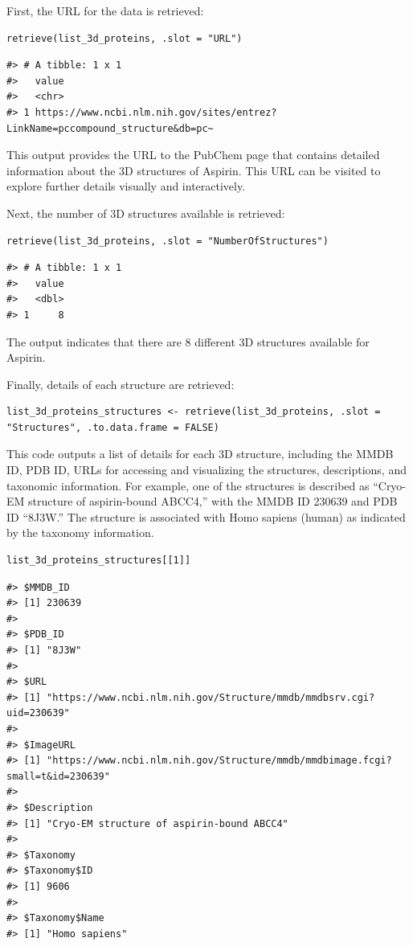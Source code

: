 First, the URL for the data is retrieved:

\begin{verbatim}
retrieve(list_3d_proteins, .slot = "URL")
\end{verbatim}

\begin{verbatim}
#> # A tibble: 1 x 1
#>   value                                                                         
#>   <chr>                                                                         
#> 1 https://www.ncbi.nlm.nih.gov/sites/entrez?LinkName=pccompound_structure&db=pc~
\end{verbatim}

This output provides the URL to the PubChem page that contains detailed information about the 3D structures of Aspirin. This URL can be visited to explore further details visually and interactively.

Next, the number of 3D structures available is retrieved:

\begin{verbatim}
retrieve(list_3d_proteins, .slot = "NumberOfStructures")
\end{verbatim}

\begin{verbatim}
#> # A tibble: 1 x 1
#>   value
#>   <dbl>
#> 1     8
\end{verbatim}

The output indicates that there are 8 different 3D structures available for Aspirin.

Finally, details of each structure are retrieved:

\begin{verbatim}
list_3d_proteins_structures <- retrieve(list_3d_proteins, .slot = "Structures", .to.data.frame = FALSE)
\end{verbatim}

This code outputs a list of details for each 3D structure, including the MMDB ID, PDB ID, URLs for accessing and visualizing the structures, descriptions, and taxonomic information. For example, one of the structures is described as ``Cryo-EM structure of aspirin-bound ABCC4,'' with the MMDB ID 230639 and PDB ID ``8J3W.'' The structure is associated with Homo sapiens (human) as indicated by the taxonomy information.

\begin{verbatim}
list_3d_proteins_structures[[1]]
\end{verbatim}

\begin{verbatim}
#> $MMDB_ID
#> [1] 230639
#> 
#> $PDB_ID
#> [1] "8J3W"
#> 
#> $URL
#> [1] "https://www.ncbi.nlm.nih.gov/Structure/mmdb/mmdbsrv.cgi?uid=230639"
#> 
#> $ImageURL
#> [1] "https://www.ncbi.nlm.nih.gov/Structure/mmdb/mmdbimage.fcgi?small=t&id=230639"
#> 
#> $Description
#> [1] "Cryo-EM structure of aspirin-bound ABCC4"
#> 
#> $Taxonomy
#> $Taxonomy$ID
#> [1] 9606
#> 
#> $Taxonomy$Name
#> [1] "Homo sapiens"
\end{verbatim}

